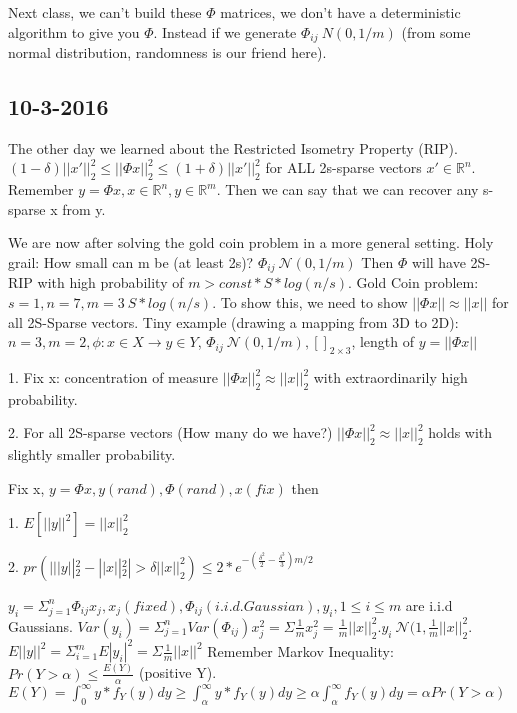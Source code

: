 \documentclass[12pt,letterpaper]{report}
\begin{document}
Next class, we can't build these $\Phi$ matrices, we don't have a deterministic algorithm to give you $\Phi$.  Instead if we generate $\Phi_{ij} ~ N(0, 1/m)$ (from some normal distribution, randomness is our friend here).

\subsection*{10-3-2016}
The other day we learned about the Restricted Isometry Property (RIP). $(1 - \delta) ||x'||_2^2 \leq ||\Phi x||_2^2 \leq (1 + \delta) ||x'||_2^2$ for ALL 2s-sparse vectors $x' \in \mathbb{R}^n$.  Remember $y = \Phi x, x \in \mathbb{R}^n, y \in \mathbb{R}^m$.  Then we can say that we can recover any s-sparse x from y.

We are now after solving the gold coin problem in a more general setting.  Holy grail: How small can m be (at least 2s)? $\Phi_{ij} ~ \mathcal{N}(0, 1/m)$  Then $\Phi$ will have 2S-RIP with high probability of $m > const*S*log(n/s)$.  Gold Coin problem: $s=1, n=7, m=3 ~ S*log(n/s)$. To show this, we need to show $||\Phi x|| \approx ||x||$ for all 2S-Sparse vectors.  Tiny example (drawing a mapping from 3D to 2D): $n = 3, m = 2, \phi : x \in X \rightarrow y \in Y$, $\Phi_{ij} ~ \mathcal{N}(0, 1/m), []_{2 \times 3}$, length of $y = ||\Phi x||$

1. Fix x: concentration of measure $||\Phi x||_2^2 \approx ||x||_2^2$ with extraordinarily high probability.

2. For all 2S-sparse vectors (How many do we have?) $||\Phi x||_2^2 \approx ||x||_2^2$ holds with slightly smaller probability.

Fix x, $y = \Phi x, y (rand), \Phi (rand), x (fix)$ then

1. $E[||y||^2] = ||x||_2^2$

2. $pr(| ||y||_2^2 - ||x||_2^2 | > \delta ||x||_2^2) \leq 2*e^{-(\frac{\delta^2}{2} -\frac{\delta^3}{3})m/2}$

$y_i = \Sigma_{j=1}^n \Phi_{ij} x_j, x_j (fixed), \Phi_{ij} (i.i.d. Gaussian), y_i, 1 \leq i \leq m$ are i.i.d Gaussians.  $Var(y_i) = \Sigma_{j=1}^n Var(\Phi_{ij}) x_j^2 = \Sigma \frac{1}{m}x_j^2 = \frac{1}{m}||x||_2^2. y_i ~ \mathcal{N}(1, \frac{1}{m}||x||_2^2$.  $E||y||^2 = \Sigma_{i=1}^m E|y_i|^2 = \Sigma \frac{1}{m}||x||^2$  Remember Markov Inequality: $Pr(Y > \alpha) \leq \frac{E(Y)}{\alpha}$ (positive Y).  $E(Y) = \int_0^\infty y *f_Y(y)dy \geq \int_\alpha^\infty y *f_Y(y)dy \geq \alpha \int_\alpha^\infty f_Y(y)dy = \alpha Pr(Y>\alpha)$
\end{document}
